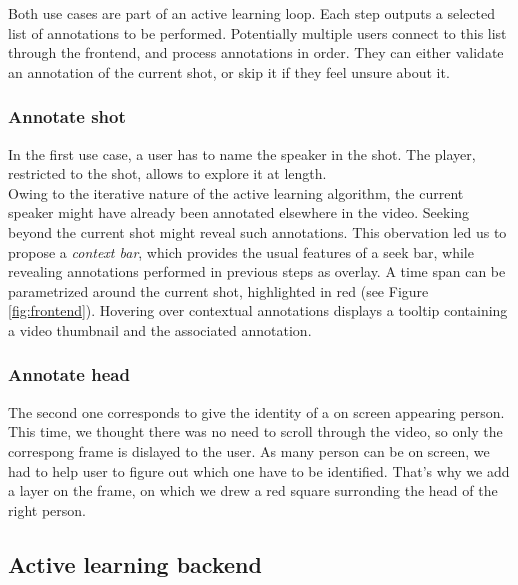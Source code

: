 \documentclass[a4paper]{article}
\begin{document}
Both use cases are part of an active learning loop. Each step outputs a selected list of annotations to be performed. Potentially multiple users connect to this list through the frontend, and process annotations in order. They can either validate an annotation of the current shot, or skip it if they feel unsure about it.


\subsubsection{Annotate shot} \label{sec:shot}
In the first use case, a user has to name the speaker in the shot. The player, restricted to the shot, allows to explore it at length.\\
Owing to the iterative nature of the active learning algorithm, the current speaker might have already been annotated elsewhere in the video. Seeking beyond the current shot might reveal such annotations. This obervation led us to propose a \emph{context bar}, which provides the usual features of a seek bar, while revealing annotations performed in previous steps as overlay. A time span can be parametrized around the current shot, highlighted in red (see Figure \ref{fig:frontend}). Hovering over contextual annotations displays a tooltip containing a video thumbnail and the associated annotation.\\

\subsubsection{Annotate head} \label{sec:head}
The second one corresponds to give the identity of a on screen appearing person. This time, we thought there was no need to scroll through the video, so only the correspong frame is dislayed to the user. As many person can be on screen, we had to help user to figure out which one have to be identified. That's why we add a layer on the frame, on which we drew a red square surronding the head of the right person.\\



      \subsection{Active learning backend}
\end{document}
